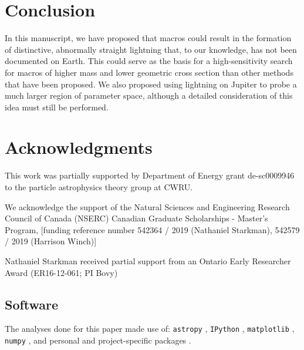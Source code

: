 \documentclass[%
 reprint,
 amsmath,amssymb,
 aps,
]{revtex4-2}
\begin{document}

\section{Conclusion} %
\label{sec:conclusion}

    In this manuscript, we have proposed that macros could result in the formation of distinctive, abnormally straight lightning that, to our knowledge, has not been documented on Earth. This could serve as the basis for a high-sensitivity search for macros of higher mass and lower geometric cross section than other methods that have been proposed. We also proposed using lightning on Jupiter to probe a much larger region of parameter space, although a detailed consideration of this idea must still be performed.



\medskip
\section{Acknowledgments} %
\label{sec:acknowledgements}

    This work was partially supported by Department of Energy grant de-sc0009946 to the particle astrophysics theory group at CWRU.

    We acknowledge the support of the Natural Sciences and Engineering Research Council of Canada (NSERC) Canadian Graduate Scholarships - Master's Program, [funding reference number 542364 / 2019 (Nathaniel Starkman), 542579 / 2019 (Harrison Winch)]
    
    Nathaniel Starkman received partial support from an Ontario Early Researcher Award (ER16-12-061; PI Bovy)

    \subsection*{Software} %
    \label{sub:software_citation}

        The analyses done for this paper made use of: \texttt{astropy} \citet{code_Astropy2013, code_Astropy2018}, \texttt{IPython} \citet{code_Perez2007}, \texttt{matplotlib} \citet{code_Hunter2007}, \texttt{numpy} \citet{code_Walt2011}, and personal and project-specific packages \citet{code_utilipy2020, code_starkplot2020, code_macrolightning2020}.
\end{document}
